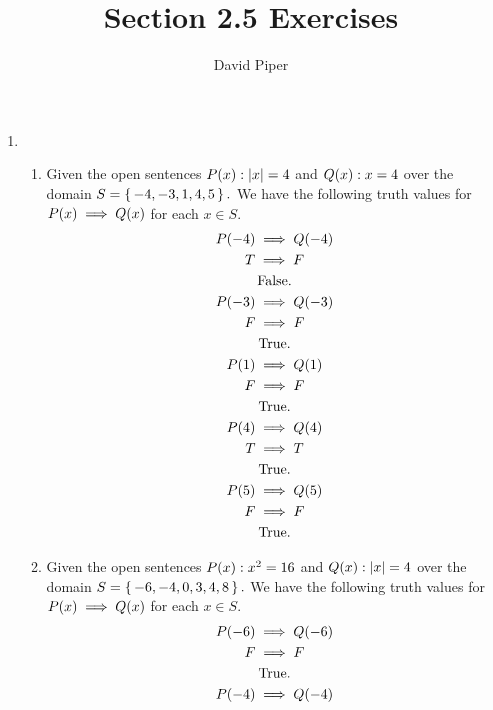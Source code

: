\documentclass[12pt]{article}
\title{Section 2.5 Exercises}
\author{David Piper}
\makeatletter
\newcommand*{\arabicodd}[1]{%
  \expandafter\@arabicodd\csname c@#1\endcsname
}
\newcommand*{\@arabicodd}[1]{%
  \@arabic{\numexpr(#1)*2-1\relax}%
}
\makeatother
\begin{document}
\maketitle

\begin{enumerate}[label=2.\arabicodd*, start=16]
  \item
    \begin{enumerate}[label=(\alph*)]
      \item Given the open sentences $P\qty(x): \abs{x} = 4$ and $Q\qty(x): x = 4$
            over the domain $S = \set{-4,-3,1,4,5}.$
            We have the following truth values for $P\qty(x) \implies Q\qty(x)$ for each
            $x \in S.$
            \begin{gather*}
              P\qty(-4) \implies Q\qty(-4)\\
              T \implies F\\
              \qq{False.}\\
              P\qty(-3) \implies Q\qty(-3)\\
              F \implies F\\
              \qq{True.}\\
              P\qty(1) \implies Q\qty(1)\\
              F \implies F\\
              \qq{True.}\\
              P\qty(4) \implies Q\qty(4)\\
              T \implies T\\
              \qq{True.}\\
              P\qty(5) \implies Q\qty(5)\\
              F \implies F\\
              \qq{True.}\\
            \end{gather*}
      \item Given the open sentences $P\qty(x): x^{2} = 16$ and $Q\qty(x): \abs{x} = 4$
            over the domain $S = \set{-6,-4,0,3,4,8}.$
            We have the following truth values for $P\qty(x) \implies Q\qty(x)$ for each
            $x \in S.$
            \begin{gather*}
              P\qty(-6) \implies Q\qty(-6)\\
              F \implies F\\
              \qq{True.}\\
              P\qty(-4) \implies Q\qty(-4)\\

\end{gather*}
\end{enumerate}
\end{enumerate}
\end{document}
